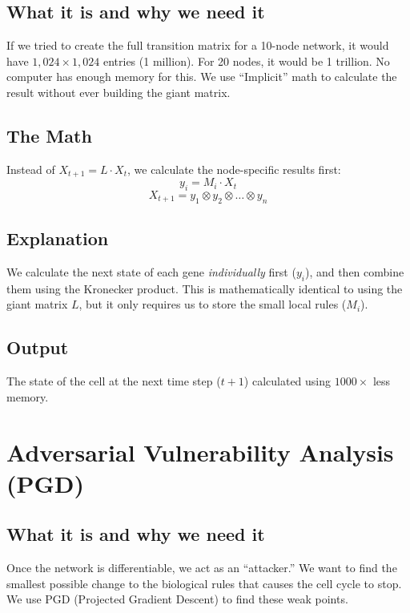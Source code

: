 \documentclass[11pt,a4paper]{article}
\begin{document}
\subsection*{What it is and why we need it}
If we tried to create the full transition matrix for a 10-node network, it would have $1,024 \times 1,024$ entries (1 million). For 20 nodes, it would be 1 trillion. No computer has enough memory for this. We use ``Implicit'' math to calculate the result without ever building the giant matrix.

\subsection*{The Math}
Instead of $X_{t+1} = L \cdot X_t$, we calculate the node-specific results first:
\begin{equation}
y_i = M_i \cdot X_t
\end{equation}
\begin{equation}
X_{t+1} = y_1 \otimes y_2 \otimes \dots \otimes y_n
\end{equation}

\subsection*{Explanation}
We calculate the next state of each gene \textit{individually} first ($y_i$), and then combine them using the Kronecker product. This is mathematically identical to using the giant matrix $L$, but it only requires us to store the small local rules ($M_i$).

\subsection*{Output}
The state of the cell at the next time step ($t+1$) calculated using $1000\times$ less memory.

\section{Adversarial Vulnerability Analysis (PGD)}

\subsection*{What it is and why we need it}
Once the network is differentiable, we act as an ``attacker.'' We want to find the smallest possible change to the biological rules that causes the cell cycle to stop. We use PGD (Projected Gradient Descent) to find these weak points.
\end{document}
